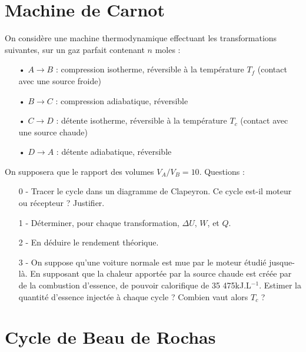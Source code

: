 \documentclass{report}
\begin{document}
\section*{Machine de Carnot}

On considère une machine thermodynamique effectuant les transformations suivantes, sur un gaz parfait contenant $n$ moles : 

\begin{itemize}
\item[•]$A \rightarrow B$ : compression isotherme, réversible à la température $T_f$ (contact avec une source froide)
\item[•]$B \rightarrow C$ : compression adiabatique, réversible
\item[•]$C \rightarrow D$ : détente isotherme, réversible à la température $T_c$ (contact avec une source chaude)
\item[•]$D \rightarrow A$ : détente adiabatique, réversible

\end{itemize}

On supposera que le rapport des volumes $V_A/V_B=10$. Questions : 

\begin{itemize}

	\item[0 -] Tracer le cycle dans un diagramme de Clapeyron. Ce cycle est-il moteur ou récepteur ? Justifier. 

	\item[1 -] Déterminer, pour chaque transformation, $\Delta U$, $W$, et $Q$. 
	
	\item[2 -] En déduire le rendement théorique.
	
	\item[3 -] On suppose qu'une voiture normale est mue par le moteur étudié jusque-là. En supposant que la chaleur apportée par la source chaude est créée par de la combustion d'essence, de pouvoir calorifique de 35 475kJ.L$^{-1}$. Estimer la quantité d'essence injectée à chaque cycle ? Combien vaut alors $T_c$ ?
	
\end{itemize}

\newpage

\section*{Cycle de Beau de Rochas}
\end{document}
